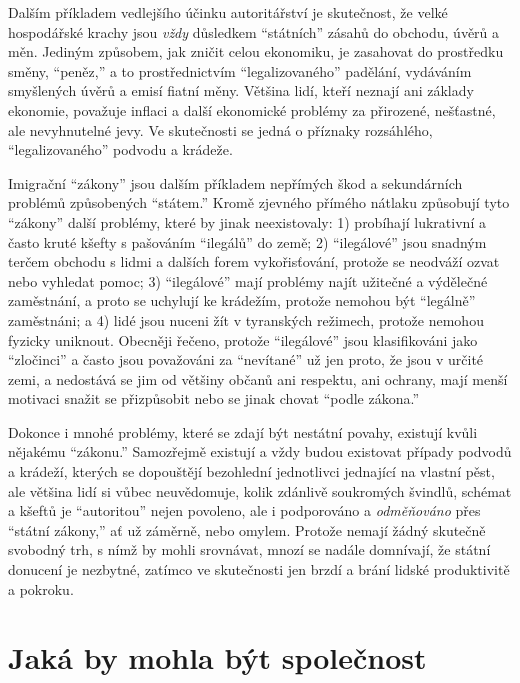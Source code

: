 \documentclass{book}
\begin{document}
Dalším příkladem vedlejšího účinku autoritářství je skutečnost, že velké hospodářské krachy jsou \emph{vždy} důsledkem \enquote{státních} zásahů do obchodu, úvěrů a měn. Jediným způsobem, jak zničit celou ekonomiku, je zasahovat do prostředku směny, \enquote{peněz,} a to prostřednictvím \enquote{legalizovaného} padělání, vydáváním smyšlených úvěrů a emisí fiatní měny. Většina lidí, kteří neznají ani základy ekonomie, považuje inflaci a další ekonomické problémy za přirozené, nešťastné, ale nevyhnutelné jevy. Ve skutečnosti se jedná o příznaky rozsáhlého, \enquote{legalizovaného} podvodu a krádeže.

Imigrační \enquote{zákony} jsou dalším příkladem nepřímých škod a sekundárních problémů způsobených \enquote{státem.} Kromě zjevného přímého nátlaku způsobují tyto \enquote{zákony} další problémy, které by jinak neexistovaly: 1) probíhají lukrativní a často kruté kšefty s pašováním \enquote{ilegálů} do země; 2) \enquote{ilegálové} jsou snadným terčem obchodu s lidmi a dalších forem vykořisťování, protože se neodváží ozvat nebo vyhledat pomoc; 3) \enquote{ilegálové} mají problémy najít užitečné a výdělečné zaměstnání, a proto se uchylují ke krádežím, protože nemohou být \enquote{legálně} zaměstnáni; a 4) lidé jsou nuceni žít v tyranských režimech, protože nemohou fyzicky uniknout. Obecněji řečeno, protože \enquote{ilegálové} jsou klasifikováni jako \enquote{zločinci} a často jsou považováni za \enquote{nevítané} už jen proto, že jsou v určité zemi, a nedostává se jim od většiny občanů ani respektu, ani ochrany, mají menší motivaci snažit se přizpůsobit nebo se jinak chovat \enquote{podle zákona.}

Dokonce i mnohé problémy, které se zdají být nestátní povahy, existují kvůli nějakému \enquote{zákonu.} Samozřejmě existují a vždy budou existovat případy podvodů a krádeží, kterých se dopouštějí bezohlední jednotlivci jednající na vlastní pěst, ale většina lidí si vůbec neuvědomuje, kolik zdánlivě soukromých švindlů, schémat a kšeftů je \enquote{autoritou} nejen povoleno, ale i podporováno a \emph{odměňováno} přes \enquote{státní zákony,} ať už záměrně, nebo omylem. Protože nemají žádný skutečně svobodný trh, s nímž by mohli srovnávat, mnozí se nadále domnívají, že státní donucení je nezbytné, zatímco ve skutečnosti jen brzdí a brání lidské produktivitě a pokroku.

\section{Jaká by mohla být společnost}
\end{document}
